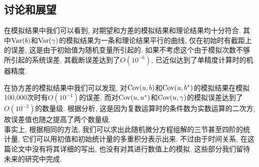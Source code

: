 \documentclass[notitlepage,cs4size,punct,oneside]{ctexrep}
\numberwithin{equation}{section}
\theoremstyle{mystyle}
\begin{document}
\subsection{讨论和展望}
在模拟结果中我们可以看到, 对期望和方差的模拟结果和理论结果均十分符合. 其中$\text{Var}(b)$和$\text{Var}(\gamma)$的模拟结果为一条和理论结果平行的曲线, 仅在初始时有截距上的误差, 这是由于初始值为随机变量所引起的. 如果不考虑这个由于模拟次数不够所引起的系统误差, 其截断误差达到了$O(10^{-6})$, 已近似达到了单精度计算时的机器精度. 

在协方差的模拟结果中我们可以发现, 对$\text{Cov}(u, b)$和$\text{Cov}(u, b^*)$的模拟结果在模拟100,000次时有$O(10^{-4})$的误差, 而对$\text{Cov}(u, u^*)$和$\text{Cov}(u, \gamma)$的模拟误差达到了$O(10^{-2})$的数量级. 根据分析\cite{golub2012matrix}, 这是因为复数运算时的条件数为实数运算的二次方, 故误差值也随之提高了两个数量级. \\

事实上, 根据相同的方法, 我们可以求出此随机微分方程组解的三节甚至四阶的统计量, 它们可以用初值和初始统计量的多重积分表示出来. 不过由于时间关系, 在这篇论文中没有将其详细的写出, 也没有对其进行数值上的模拟. 这些部分我们留待未来的研究中完成.




\end{document}
